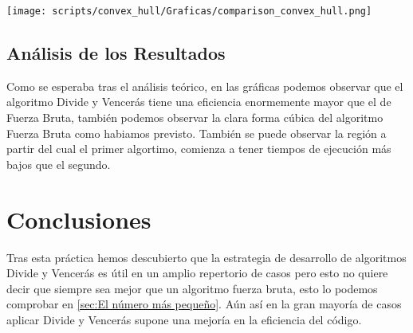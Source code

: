 \documentclass[a4paper,12pt]{article}
\begin{document}
\begin{center}
\texttt{[image: scripts/convex\_hull/Graficas/comparison\_convex\_hull.png]}
\end{center}

\subsection{Análisis de los Resultados}
Como se esperaba tras el análisis teórico, en las gráficas podemos observar que el algoritmo Divide y Vencerás 
tiene una eficiencia enormemente mayor que el de Fuerza Bruta, también podemos observar la clara forma cúbica del algoritmo
Fuerza Bruta como habiamos previsto. También se puede observar la región a partir del cual el primer algortimo, comienza 
a tener tiempos de ejecución más bajos que el segundo.

\section{Conclusiones}
Tras esta práctica hemos descubierto que la estrategia de desarrollo de algoritmos Divide y Vencerás 
es útil en un amplio repertorio de casos pero esto no quiere decir que siempre sea mejor que un algoritmo 
fuerza bruta, esto lo podemos comprobar en \ref{sec:El número más pequeño}. Aún así en la gran mayoría de casos aplicar Divide y Vencerás 
supone una mejoría en la eficiencia del código.
\end{document}
